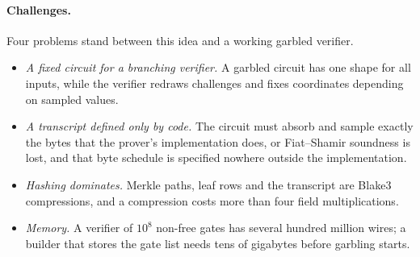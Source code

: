 \documentclass[11pt]{article}
\begin{document}
\paragraph{Challenges.} Four problems stand between this idea and a working
garbled verifier.
\begin{itemize}
  \item[C1] \emph{A fixed circuit for a branching verifier.} A garbled circuit has
    one shape for all inputs, while the verifier redraws challenges and fixes
    coordinates depending on sampled values.
  \item[C2] \emph{A transcript defined only by code.} The circuit must absorb and
    sample exactly the bytes that the prover's implementation does, or Fiat--Shamir
    soundness is lost, and that byte schedule is specified nowhere outside the
    implementation.
  \item[C3] \emph{Hashing dominates.} Merkle paths, leaf rows and the transcript
    are Blake3 compressions, and a compression costs more than four field
    multiplications.
  \item[C4] \emph{Memory.} A verifier of $10^8$ non-free gates has several
    hundred million wires; a builder that stores the gate list needs tens of
    gigabytes before garbling starts.
\end{itemize}
\end{document}
